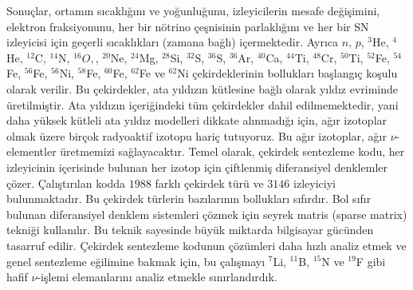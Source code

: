 Sonuçlar, ortamın sıcaklığını ve yoğunluğunu, izleyicilerin mesafe değişimini, elektron fraksiyonunu, her bir nötrino çeşnisinin parlaklığını ve her bir SN izleyicisi için geçerli sıcaklıkları (zamana bağlı) içermektedir. Ayrıca $n$, $p$, $ ^{3} $He, $ ^{4} $He, $ ^{12} $C, $ ^{14} $N, $ ^{16}O, $, $^{20} $Ne, $ ^{24} $Mg, $ ^{28} $Si, $ ^{32} $S, $ ^{36} $S, $ ^{36} $Ar, $ ^{ 40} $Ca, $ ^{44} $Ti, $ ^{48} $Cr, $ ^{50} $Ti, $ ^{52} $Fe, $ ^{54} $Fe, $ ^{56} $Fe, $ ^{56} $Ni, $ ^{58} $Fe, $ ^{60} $Fe, $ ^{62} $Fe ve $ ^{62} $Ni çekirdeklerinin bollukları başlangıç koşulu olarak verilir. Bu çekirdekler, ata yıldızın kütlesine bağlı olarak yıldız evriminde üretilmiştir. Ata yıldızın içeriğindeki tüm çekirdekler dahil edilmemektedir, yani daha yüksek kütleli ata yıldız modelleri dikkate alınmadığı için, ağır izotoplar olmak üzere birçok radyoaktif izotopu hariç tutuyoruz. Bu ağır izotoplar, ağır $ \nu $-elementler üretmemizi sağlayacaktır. Temel olarak, çekirdek sentezleme kodu, her izleyicinin içerisinde bulunan her izotop için çiftlenmiş diferansiyel denklemler çözer. Çalıştırılan kodda $1988$ farklı çekirdek türü ve $3146$ izleyiciyi bulunmaktadır. Bu çekirdek türlerin bazılarının bollukları sıfırdır. Bol sıfır bulunan diferansiyel denklem sistemleri çözmek için seyrek matris (sparse matrix) tekniği kullanılır. Bu teknik sayesinde büyük miktarda bilgisayar gücünden tasarruf edilir. Çekirdek sentezleme kodunun çözümleri daha hızlı analiz etmek ve genel sentezleme eğilimine bakmak için, bu çalışmayı $ ^{7} $Li, $ ^{11} $B, $ ^{15} $N ve $ ^{19} $F gibi hafif $ \nu $-işlemi elemanlarını analiz etmekle sınırlandırdık.

